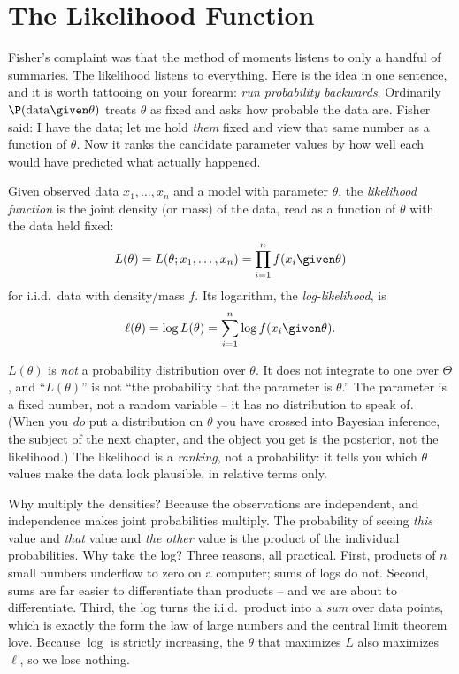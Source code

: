 \section{The Likelihood Function}
\label{ch30:likelihood}

Fisher's complaint was that the method of moments listens to only a handful of
summaries. The likelihood listens to everything. Here is the idea in one
sentence, and it is worth tattooing on your forearm: \emph{run probability
backwards}. Ordinarily $\P(\text{data} \given \theta)$ treats $\theta$ as fixed
and asks how probable the data are. Fisher said: I have the data; let me hold
\emph{them} fixed and view that same number as a function of $\theta$. Now it
ranks the candidate parameter values by how well each would have predicted what
actually happened.

\begin{definition}
\label{ch30:def-likelihood}
Given observed data $x_1,\dots,x_n$ and a model with parameter $\theta$, the
\emph{likelihood function} is the joint density (or mass) of the data, read as a
function of $\theta$ with the data held fixed:
\[
  L(\theta) = L(\theta; x_1,\dots,x_n) = \prod_{i=1}^n f(x_i \given \theta)
\]
for i.i.d.\ data with density/mass $f$. Its logarithm, the \emph{log-likelihood},
is
\[
  \ell(\theta) = \log L(\theta) = \sum_{i=1}^n \log f(x_i \given \theta).
\]
\end{definition}

\begin{trapbox}
$L(\theta)$ is \emph{not} a probability distribution over $\theta$. It does not
integrate to one over $\Theta$, and ``$L(\theta)$'' is not ``the probability
that the parameter is $\theta$.'' The parameter is a fixed number, not a random
variable -- it has no distribution to speak of. (When you \emph{do} put a
distribution on $\theta$ you have crossed into Bayesian inference, the subject
of the next chapter, and the object you get is the posterior, not the
likelihood.) The likelihood is a \emph{ranking}, not a probability: it tells you
which $\theta$ values make the data look plausible, in relative terms only.
\end{trapbox}

\begin{whybox}
Why multiply the densities? Because the observations are independent, and
independence makes joint probabilities multiply. The probability of seeing
\emph{this} value and \emph{that} value and \emph{the other} value is the
product of the individual probabilities. Why take the log? Three reasons, all
practical. First, products of $n$ small numbers underflow to zero on a computer;
sums of logs do not. Second, sums are far easier to differentiate than products
-- and we are about to differentiate. Third, the log turns the i.i.d.\ product
into a \emph{sum} over data points, which is exactly the form the law of large
numbers and the central limit theorem love. Because $\log$ is strictly
increasing, the $\theta$ that maximizes $L$ also maximizes $\ell$, so we lose
nothing.
\end{whybox}

